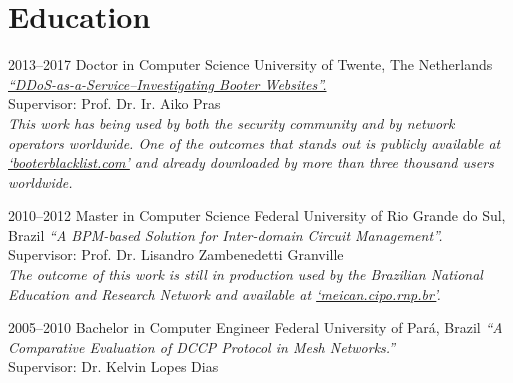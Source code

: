 \documentclass[print]{styles/friggeri-cv-mac} %
\begin{document}


\setlength\parindent{0pt}
\section{Education}\vspace{-5pt}

\begin{entrylist}

\entry
{2013--2017}
{Doctor {\normalfont in Computer Science}}
{University of Twente, The Netherlands}
{\emph{\href{https://research.utwente.nl/files/18494043/jjsantanna_thesis.pdf}{``DDoS-as-a-Service--Investigating Booter Websites''.}} \\
Supervisor: Prof. Dr. Ir. Aiko Pras\\	
\textit{This work has being used by both the security community and by
network operators worldwide. One of the outcomes that stands out is publicly available at \href{http://booterblacklist.com}{`booterblacklist.com'} and  already downloaded by more than three thousand users worldwide.}}

\entry
{2010--2012}
{Master {\normalfont in Computer Science}}
{Federal University of Rio Grande do Sul, Brazil}
{\emph{``A BPM-based Solution for Inter-domain Circuit Management''.}\\
Supervisor: Prof. Dr. Lisandro Zambenedetti Granville\\
\textit{The outcome of this work is still in production used by the Brazilian
National Education and Research Network and available at
\href{http://meican.cipo.rnp.br/}{`meican.cipo.rnp.br'}.}}

\entry
{2005--2010}
{Bachelor {\normalfont in Computer Engineer}}
{Federal University of Par\'a, Brazil}
{\emph{``A Comparative Evaluation of DCCP Protocol in Mesh Networks.''} \\ 
Supervisor: Dr. Kelvin Lopes Dias
}

\end{entrylist}

\end{document}
